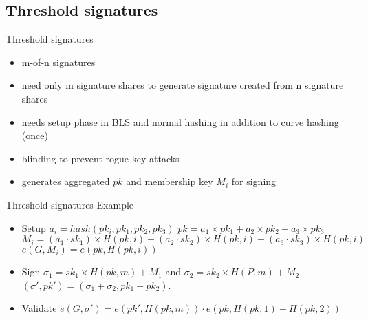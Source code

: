 \documentclass{beamer}
\begin{document}
\subsection{Threshold signatures}
\begin{frame}{Threshold signatures}
	\begin{itemize}
		\item m-of-n signatures
		\item need only m signature shares to generate signature created from n signature shares
		\item needs setup phase in BLS and normal hashing in addition to curve hashing (once)
		\item blinding to prevent rogue key attacks
		\item generates aggregated $pk$ and membership key $M_i$ for signing
	\end{itemize}
\end{frame}
\begin{frame}{Threshold signatures}
	Example
	\begin{itemize}
		\item Setup \newline
		$a_i = hash(pk_i,{pk_1,pk_2,pk_3})$ \newline
		$pk = a_1\times{pk_1}+a_2\times{pk_2}+a_3\times{pk_3}$ \newline
		$M_i = (a_1 \cdot sk_1) \times{H(pk,i)} + (a_2 \cdot sk_2) \times{H(pk,i)} + (a_3 \cdot sk_3) \times{H(pk,i)}$ \newline
		$e(G,M_i) = e(pk,H(pk,i))$
		\item Sign \newline
		$\sigma_1 = sk_1 \times{H(pk,m)} + M_1$ and $\sigma_2 = sk_2 \times{H(P,m)} + M_2$
		$(\sigma',pk') = (\sigma_1 + \sigma_2, pk_1 + pk_2)$.
		\item Validate \newline
		$e(G,\sigma') = e(pk',H(pk,m)) \cdot e(pk, H(pk,1)+H(pk,2))$
	\end{itemize}
\end{frame}
\end{document}

